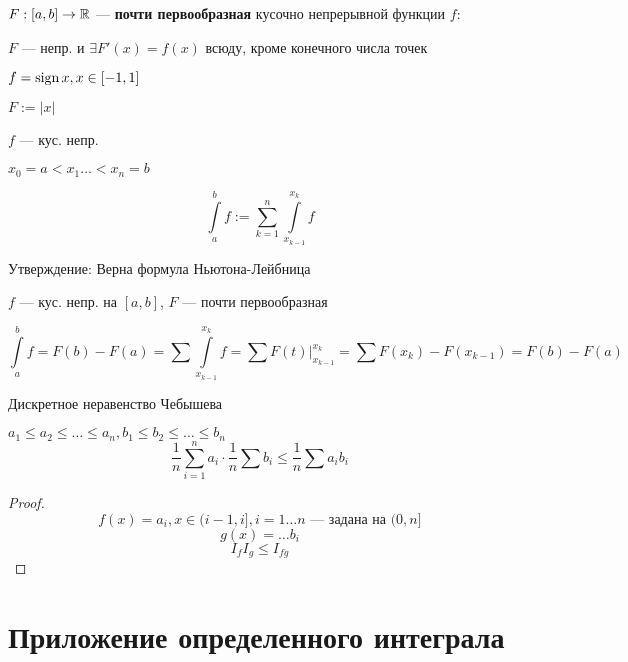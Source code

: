 \begin{definition}
    $F:[a,b]\to\mathbb{R}$ --- \textbf{почти первообразная} кусочно непрерывной функции $f$:
    
    $F$ --- непр. и $\exists F'(x) = f(x)$ всюду, кроме конечного числа точек
    \begin{example}
        $f=\operatorname{\text{sign}} x, x\in[-1,1]$

        $F:=|x|$
    \end{example}
\end{definition}

$f$ --- кус. непр.

$x_0=a<x_1\ldots<x_n=b$

$$\int\limits_a^b f := \sum\limits_{k=1}^n \int\limits_{x_{k-1}}^{x_k} f$$

Утверждение: Верна формула Ньютона-Лейбница

$f$ --- кус. непр. на $[a,b]$, $F$ --- почти первообразная

$$\int\limits_{a}^{b} f = F(b)-F(a)=\sum\int\limits_{x_{k-1}}^{x_k} f = \sum F(t)|_{x_{k-1}}^{x_k}=\sum F(x_k)-F(x_{k-1})=F(b)-F(a)$$

\begin{example}
    Дискретное неравенство Чебышева

    $a_1\leq a_2\leq \ldots \leq a_n, b_1\leq b_2\leq\ldots\leq b_n$
    $$\frac{1}{n}\sum\limits_{i=1}^n a_i\cdot \frac{1}{n}\sum b_i\leq \frac{1}{n}\sum a_ib_i$$
\end{example}
\begin{proof}
    $$f(x)=a_i, x\in(i-1, i], i=1\ldots n \text{ --- задана на } (0,n]$$
    $$g(x) = \ldots b_i$$
    $$I_fI_g\leq I_{fg}$$
\end{proof}

\section{Приложение определенного интеграла}

